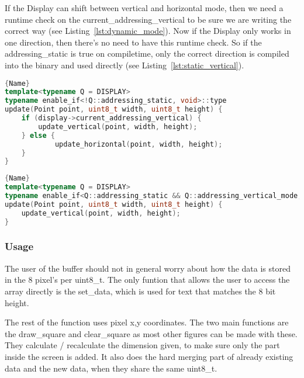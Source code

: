 If the Display can shift between vertical and horizontal mode, then we need a runtime check on the current\_addressing\_vertical to be sure we are writing the correct way (see Listing~\ref{lst:dynamic_mode}). Now if the Display only works in one direction, then there's no need to have this runtime check. So if the addressing\_static is true on compiletime, only the correct direction is compiled into the binary and used directly (see Listing~\ref{lst:static_vertical}).

\noindent\begin{minipage}[t]{.45\textwidth}
\begin{lstlisting}[caption={Dynamic Mode},label={lst:dynamic_mode},frame=tlrb, language=C++]{Name}
template<typename Q = DISPLAY>
typename enable_if<!Q::addressing_static, void>::type
update(Point point, uint8_t width, uint8_t height) {
    if (display->current_addressing_vertical) {
  	    update_vertical(point, width, height);
  	} else {
  			update_horizontal(point, width, height);
  	}
}
\end{lstlisting}
\end{minipage}\hfill
\begin{minipage}[t]{.45\textwidth}
\begin{lstlisting}[caption={Static Vertical Mode},label={lst:static_vertical},frame=tlrb, language=C++]{Name}
template<typename Q = DISPLAY>
typename enable_if<Q::addressing_static && Q::addressing_vertical_mode, void>::type
update(Point point, uint8_t width, uint8_t height) {
    update_vertical(point, width, height);
}
\end{lstlisting}
\end{minipage}

\subsubsection{Usage}

The user of the buffer should not in general worry about how the data is stored in the 8 pixel's per uint8\_t. The only funtion that allows the user to access the array directly is the set\_data, which is used for text that matches the 8 bit height.

The rest of the function uses pixel x,y coordinates. The two main functions are the draw\_square and clear\_square as most other figures can be made with these. They calculate / recalculate the dimension given, to make sure only the part inside the screen is added. It also does the hard merging part of already existing data and the new data, when they share the same uint8\_t.
